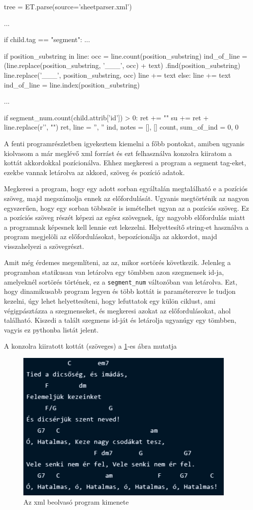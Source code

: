 \begin{python}
tree = ET.parse(source='sheetparser.xml')

...

if child.tag == "segment":
	...
	
  if position_substring in line:
    occ = line.count(position_substring)
    ind_of_line = (line.replace(position_substring, '___', occ) + text)
      .find(position_substring)
    line.replace('___', position_substring, occ)
    line += text
  else:
    line += text
    ind_of_line = line.index(position_substring)
	            
     ...
     
  if segment_num.count(child.attrib['id']) > 0:
    ret += "\n"
    su += ret + line.replace(r'\n', "\n")
    ret, line = '', ''
    ind, notes = [], []
    count, sum_of_ind = 0, 0
\end{python}

A fenti programrészletben igyekeztem kiemelni a főbb pontokat, amiben ugyanis kiolvasom a már meglévő xml forrást és ezt felhasználva konzolra kiiratom a kottát akkordokkal pozícionálva. Ehhez megkeresi a program a segment tag-eket, ezekbe vannak letárolva az akkord, szöveg és pozíció adatok. 
\par
Megkeresi a program, hogy egy adott sorban egyáltalán megtalálható e a pozíciós szöveg, majd megszámolja ennek az előfordulását. Ugyanis megtörténik az nagyon egyszerűen, hogy egy sorban többször is ismételhet ugyan az a pozíciós szöveg. Ez a pozíciós szöveg részét képezi az egész szövegnek, így nagyobb előfordulás miatt a programnak képesnek kell lennie ezt lekezelni. Helyettesítő string-et használva a program megjelöli az előfordulásokat, bepozícionálja az akkordot, majd visszahelyezi a szövegrészt.
\par
Amit még érdemes megemlíteni, az az, mikor sortörés következik. Jelenleg a programban statikusan van letárolva egy tömbben azon szegmensek id-ja, amelyeknél sortörés történek, ez a \texttt{segment\_num} változóban van letárolva. Ezt, hogy dinamikusabb program legyen és több kottát is paraméterezve le tudjon kezelni, úgy lehet helyettesíteni, hogy lefuttatok egy külön ciklust, ami végigpásztázza a szegmenseket, és megkeresi azokat az előfordulásokat, ahol \texttt{} található. Kiszedi a talált szegmens id-ját és letárolja ugyanúgy egy tömbben, vagyis ez pythonba listát jelent.
\par
A konzolra kiiratott kottát (szöveges) a \ref{fig:output1}-es ábra mutatja

\begin{figure}[h]
	\includegraphics[scale=1]{images/output_tied.png}
	\caption{Az xml beolvasó program kimenete}
	\label{fig:output1}
\end{figure}